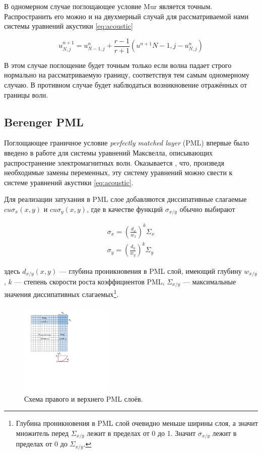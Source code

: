 В одномерном случае поглощающее условие Mur является точным. Распространить его можно и на двухмерный случай для рассматриваемой нами системы уравнений акустики \eqref{eq:acoustic}

\begin{equation}
    u^{n+1}_{N,j} = u^n_{N-1,j} + \dfrac{r-1}{r+1}(u^{n+1}{N-1,j}-u^n_{N,j})
\end{equation}

В этом случае поглощение будет точным только если волна падает строго нормально на рассматриваемую границу, соответствуя тем самым одномерному случаю. В противном случае будет наблюдаться  возникновение отражённых от границы волн.

\subsection{Berenger PML}

Поглощающее граничное условие \textit{perfectly matched layer} (PML) впервые было введено в работе \cite{berenger} для системы уравнений Максвелла, описывающих распространение электромагнитных волн. Оказывается \cite{pml_from_maxwell}, что, произведя необходимые замены переменных, эту систему уравнений можно свести к системе уравнений акустики \eqref{eq:acoustic}.

Для реализации затухания в PML слое добавляются диссипативные слагаемые $c u \sigma_x(x,y)$ и $c u \sigma_y(x,y)$, где в качестве функций $\sigma_{x/y}$ обычно выбирают

\begin{equation}
\begin{gathered}
	\sigma_x = \left(\frac{d_x}{w_{x}}\right)^k \Sigma_{x}\\
	\sigma_y = \left(\frac{d_y}{w_{y}}\right)^k \Sigma_{y}
\end{gathered}
\label{eq:pml_coefs}
\end{equation}

здесь $d_{x/y}(x,y)$ --- глубина проникновения в PML слой, имеющий глубину $w_{x/y}$, $k$ --- степень скорости роста коэффициентов PML, $\Sigma_{x/y}$ --- максимальные значения диссипативных слагаемых\footnote{Глубина проникновения в PML слой очевидно меньше ширины слоя, а значит множитель перед $\Sigma_{x/y}$ лежит в пределах от 0 до 1. Значит $\sigma_{x/y}$ лежит в пределах от 0 до $\Sigma_{x/y}$.}. 

\begin{figure}[htp]
    \centering
    \includegraphics[trim={72pt 325pt 430pt 55pt},clip,width=0.4\textwidth]{images/pml/pml_scheme.png}
    \caption{Схема правого и верхнего PML слоёв.}
    \label{fig:pml_scheme}
\end{figure}

